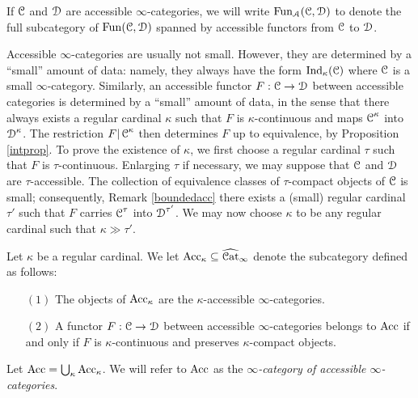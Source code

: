 \begin{notation}
If $\operatorname{\mathcal{C}}$ and $\operatorname{\mathcal{D}}$ are accessible $\infty$-categories, we will write
$\operatorname{Fun_{\mathcal{A}}}(\operatorname{\mathcal{C}}, \operatorname{\mathcal{D}})$ to denote the full subcategory of $\operatorname{Fun}(\operatorname{\mathcal{C}}, \operatorname{\mathcal{D}})$
spanned by accessible functors from $\operatorname{\mathcal{C}}$ to $\operatorname{\mathcal{D}}$.
\end{notation}

\begin{remark}
Accessible $\infty$-categories are usually not small. However, they are determined by a ``small'' amount of data: namely, they always have the form $\operatorname{Ind}_{\kappa}(\operatorname{\mathcal{C}})$ where $\operatorname{\mathcal{C}}$ is a small $\infty$-category. Similarly, an accessible functor $F: \operatorname{\mathcal{C}} \rightarrow \operatorname{\mathcal{D}}$ between accessible categories is determined by a ``small'' amount of data, in the sense that there always exists
a regular cardinal $\kappa$ such that $F$ is $\kappa$-continuous and maps
$\operatorname{\mathcal{C}}^{\kappa}$ into $\operatorname{\mathcal{D}}^{\kappa}$. The restriction $F| \operatorname{\mathcal{C}}^{\kappa}$ then determines
$F$ up to equivalence, by Proposition \ref{intprop}. To prove the existence of $\kappa$, 
we first choose a regular cardinal $\tau$ such that $F$ is $\tau$-continuous. Enlarging $\tau$ if necessary, we may suppose that $\operatorname{\mathcal{C}}$ and $\operatorname{\mathcal{D}}$ are $\tau$-accessible. The collection of equivalence classes of $\tau$-compact objects of $\operatorname{\mathcal{C}}$ is small; consequently, Remark \ref{boundedacc} there exists a (small) regular cardinal $\tau'$ such that
$F$ carries $\operatorname{\mathcal{C}}^{\tau}$ into $\operatorname{\mathcal{D}}^{\tau'}$. We may now choose $\kappa$ to be any regular cardinal such that $\kappa \gg \tau'$. 
\end{remark}

\begin{definition}
Let $\kappa$ be a regular cardinal.
We let $\operatorname{Acc}_{\kappa} \subseteq \widehat{\operatorname{\mathcal{C}at}}_{\infty}$ denote the subcategory defined as follows:
\begin{itemize}
\item[$(1)$] The objects of $\operatorname{Acc}_{\kappa}$ are the $\kappa$-accessible $\infty$-categories.
\item[$(2)$] A functor $F: \operatorname{\mathcal{C}} \rightarrow \operatorname{\mathcal{D}}$ between accessible $\infty$-categories
belongs to $\operatorname{Acc}$ if and only if $F$ is $\kappa$-continuous and preserves $\kappa$-compact objects. 
\end{itemize}
Let $\operatorname{Acc} = \bigcup_{\kappa} \operatorname{Acc}_{\kappa}$.
We will refer to $\operatorname{Acc}$ as the {\it $\infty$-category of accessible $\infty$-categories}.
\end{definition}

